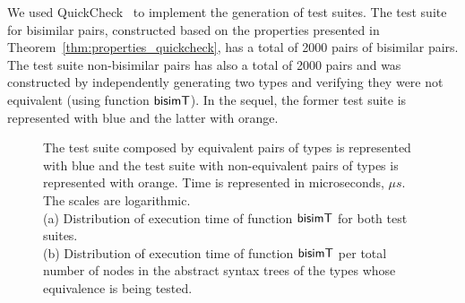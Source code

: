 We used QuickCheck~\cite{DBLP:conf/icfp/ClaessenH00} to implement the
generation of test suites. The test suite for bisimilar pairs, constructed
based on the properties presented in Theorem~\ref{thm:properties_quickcheck},
has a total of 2000 pairs of bisimilar pairs. The test suite non-bisimilar
pairs has also a total of 2000 pairs and was 
constructed by independently generating two types and verifying they were
not equivalent (using function $\mathsf{bisimT}$). In the sequel, the former test suite
is represented with blue and the latter with orange.


\begin{figure}[h!]
    \centering
    \caption{The test suite composed by equivalent pairs of types is represented with blue and the
    test suite with non-equivalent pairs of types is represented with orange. Time is represented
    in microseconds, $\mu s$. The scales are logarithmic.\\
    (a) Distribution of execution time of function $\mathsf{bisimT}$ for both test suites.\\
    (b) Distribution of execution time of function $\mathsf{bisimT}$ per total number of nodes 
    in the abstract syntax trees of the types whose equivalence is being tested.}%
    \label{fig:results}%
\end{figure}

